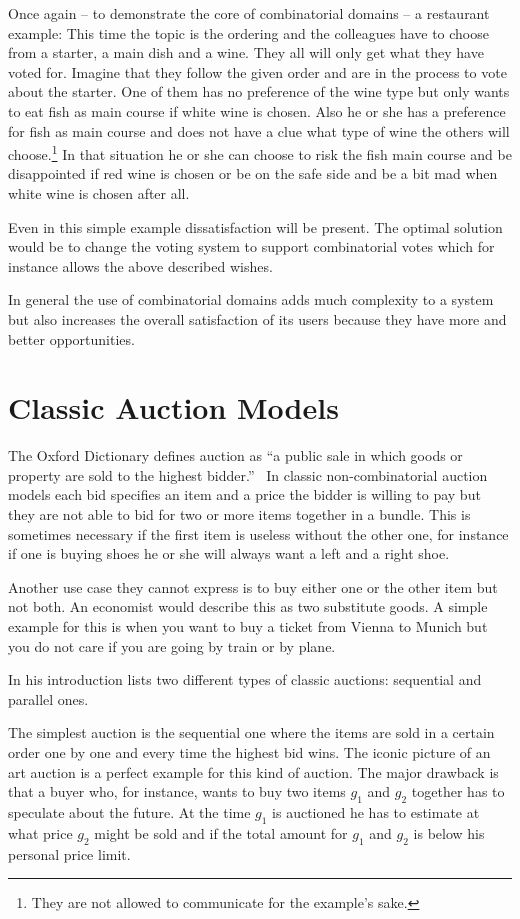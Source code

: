 \documentclass[a4paper]{paper}
\begin{document}
Once again -- to demonstrate the core of combinatorial domains -- a restaurant example: This time the topic is the ordering and the colleagues have to choose from a starter, a main dish and a wine. They all will only get what they have voted for. Imagine that they follow the given order and are in the process to vote about the starter. One of them has no preference of the wine type but only wants to eat fish as main course if white wine is chosen. Also he or she has a preference for fish as main course and does not have a clue what type of wine the others will choose.\footnote{They are not allowed to communicate for the example's sake.} In that situation he or she can choose to risk the fish main course and be disappointed if red wine is chosen or be on the safe side and be a bit mad when white wine is chosen after all. 

Even in this simple example dissatisfaction will be present. The optimal solution would be to change the voting system to support combinatorial votes which for instance allows the above described wishes.

In general the use of combinatorial domains adds much complexity to a system but also increases the overall satisfaction of its users because they have more and better opportunities.

\section{Classic Auction Models}

The Oxford Dictionary defines auction as ``a public sale in which goods or property are sold to the highest bidder.''~\cite{OD:auction} 
In classic non-combinatorial auction models each bid specifies an item and a price the bidder is willing to pay but they are not able to bid for two or more items together in a bundle. This is sometimes necessary if the first item is useless without the other one, for instance if one is buying shoes he or she will always want a left and a right shoe.

Another use case they cannot express is to buy either one or the other item but not both. An economist would describe this as two substitute goods. A simple example for this is when you want to buy a ticket from Vienna to Munich but you do not care if you are going by train or by plane.

In his introduction \cite{San02} lists two different types of classic auctions: sequential and parallel ones.

The simplest auction is the sequential one where the items are sold in a certain order one by one and every time the highest bid wins. The iconic picture of an art auction is a perfect example for this kind of auction. The major drawback is that a buyer who, for instance, wants to buy two items $g_1$ and $g_2$ together has to speculate about the future. At the time $g_1$ is auctioned he has to estimate at what price $g_2$ might be sold and if the total amount for $g_1$ and $g_2$ is below his personal price limit.
\end{document}
